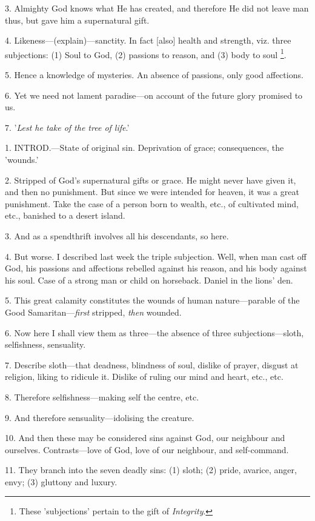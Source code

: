3. Almighty God knows what He has created, and
therefore He did not leave man thus, but gave him a supernatural gift.

4. Likeness—(explain)—sanctity. In fact
[also] health and strength, viz. three subjections: (1) Soul to God,
(2) passions to reason, and (3) body to soul \footnote{These 'subjections'
pertain to the gift of \emph{Integrity}.}.

5. Hence a knowledge of mysteries. An absence of
passions, only good affections.

6. Yet we need not lament paradise—on account
of the future glory promised to us.

7. '\emph{Lest he take of the tree of life}.'


1. INTROD.—State
of original sin. Deprivation of grace; consequences, the 'wounds.'

2. Stripped of God's supernatural gifts or grace.
He might never have given it, and then no punishment. But since
we were intended for heaven, it was a great punishment. Take the case
of a person born to wealth, etc., of cultivated mind, etc., banished
to a desert island.

3. And as a spendthrift involves all his
descendants, so here.

4. But worse. I described last week the triple
subjection. Well, when man cast off God, his passions and affections
rebelled against his reason, and his body against his soul. Case of a
strong man or child on horseback. Daniel in the lions' den.

5. This great calamity constitutes the wounds of
human nature—parable of the Good Samaritan—\emph{first} stripped, \emph{then}
wounded.

6. Now here I shall view them as three—the
absence of three subjections—sloth, selfishness, sensuality.

7. Describe sloth—that deadness, blindness of
soul, dislike of prayer, disgust at religion, liking to ridicule it.
Dislike of ruling our mind and heart, etc., etc.

8. Therefore selfishness—making self the
centre, etc.

9. And therefore sensuality—idolising the
creature.

10. And then these may be considered sins against
God, our neighbour and ourselves. Contrasts—love of God, love of our
neighbour, and self-command.

11. They branch into the seven deadly sins: (1)
sloth; (2) pride, avarice, anger, envy; (3) gluttony and luxury.


